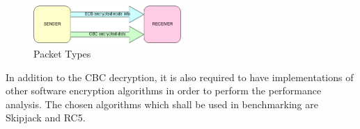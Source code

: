  
\begin{figure}[ht] \centering
  \includegraphics[width=0.5\textwidth]{img/send-receive.png}
  \caption{Packet Types}
\end{figure}


In addition to the CBC decryption, it is also required to have implementations of other software encryption algorithms in order to perform the performance analysis. The chosen 
algorithms which shall be used in benchmarking are Skipjack and RC5.
